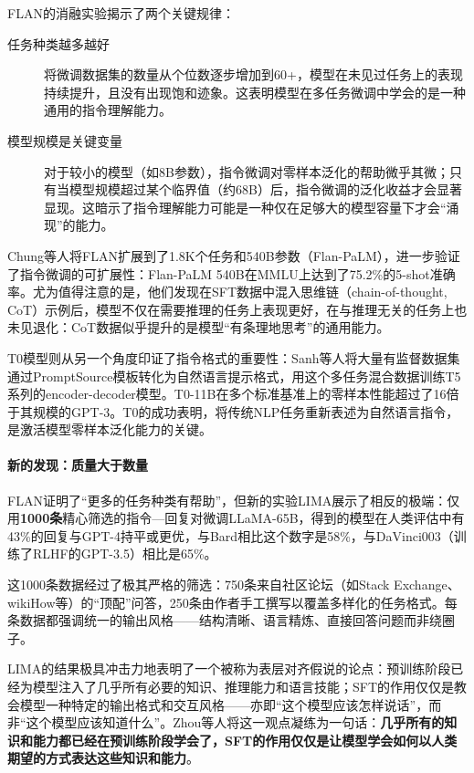 FLAN的消融实验揭示了两个关键规律：
\begin{description}
    \item[任务种类越多越好] 将微调数据集的数量从个位数逐步增加到60+，模型在未见过任务上的表现持续提升，且没有出现饱和迹象。这表明模型在多任务微调中学会的是一种通用的指令理解能力。
    \item[模型规模是关键变量] 对于较小的模型（如8B参数），指令微调对零样本泛化的帮助微乎其微；只有当模型规模超过某个临界值（约68B）后，指令微调的泛化收益才会显著显现。这暗示了指令理解能力可能是一种仅在足够大的模型容量下才会“涌现”的能力。
\end{description}

Chung等人将FLAN扩展到了1.8K个任务和540B参数（Flan-PaLM），进一步验证了指令微调的可扩展性：Flan-PaLM 540B在MMLU上达到了75.2\%的5-shot准确率\cite{chung2024scalinginstructionfinetunedlanguage}。尤为值得注意的是，他们发现在SFT数据中混入思维链（chain-of-thought, CoT）示例后，模型不仅在需要推理的任务上表现更好，在与推理无关的任务上也未见退化：CoT数据似乎提升的是模型“有条理地思考”的通用能力。

T0模型则从另一个角度印证了指令格式的重要性：Sanh等人将大量有监督数据集通过PromptSource模板转化为自然语言提示格式，用这个多任务混合数据训练T5系列的encoder-decoder模型。T0-11B在多个标准基准上的零样本性能超过了16倍于其规模的GPT-3\cite{sanh2022multitaskpromptedtraining}。T0的成功表明，将传统NLP任务重新表述为自然语言指令，是激活模型零样本泛化能力的关键。

\paragraph{新的发现：质量大于数量}

FLAN证明了“更多的任务种类有帮助”，但新的实验LIMA展示了相反的极端\cite{zhou2023lima}：仅用\textbf{1000条}精心筛选的指令—回复对微调LLaMA-65B，得到的模型在人类评估中有43\%的回复与GPT-4持平或更优，与Bard相比这个数字是58\%，与DaVinci003（训练了RLHF的GPT-3.5）相比是65\%。

这1000条数据经过了极其严格的筛选：750条来自社区论坛（如Stack Exchange、wikiHow等）的“顶配”问答，250条由作者手工撰写以覆盖多样化的任务格式。每条数据都强调统一的输出风格——结构清晰、语言精炼、直接回答问题而非绕圈子。

LIMA的结果极具冲击力地表明了一个被称为表层对齐假说的论点：预训练阶段已经为模型注入了几乎所有必要的知识、推理能力和语言技能；SFT的作用仅仅是教会模型一种特定的输出格式和交互风格——亦即“这个模型应该怎样说话”，而非“这个模型应该知道什么”。Zhou等人将这一观点凝练为一句话：\textbf{几乎所有的知识和能力都已经在预训练阶段学会了，SFT的作用仅仅是让模型学会如何以人类期望的方式表达这些知识和能力}。

